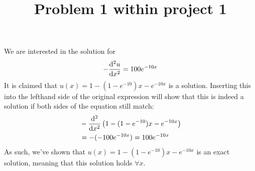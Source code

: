 \documentclass{article}
\title{Problem 1 within project 1}
\begin{document}
\maketitle
We are interested in the solution for
\begin{align*}
    -\dv[2]{u}{x}  = 100 e^{-10x}
\end{align*}
It is claimed that $u(x)=1-(1-e^{-10})x-e^{-10x}$ is a solution. Inserting this into the lefthand side of the original expression will show that this is indeed a solution if both sides
of the equation still match:
\begin{align*}
     & -\dv[2]{}{x}\left(1-(1-e^{-10})x-e^{-10x}\right) \\
     & =-(-100e^{-10x})=100e^{-10x}
\end{align*}
As such, we've shown that $u(x)=1-(1-e^{-10})x-e^{-10x}$ is an exact solution, meaning that this solution holds $\forall x$.
\end{document}
